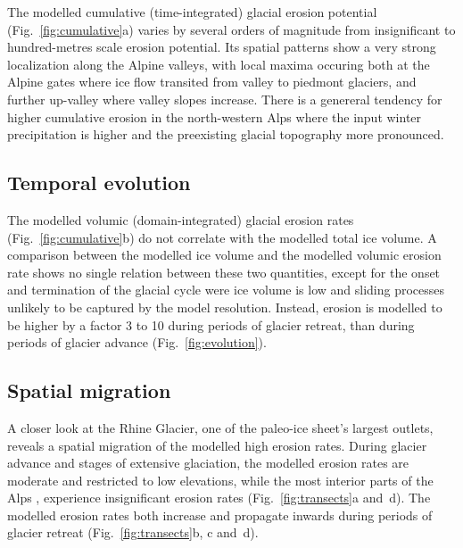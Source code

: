 \documentclass[utf8]{article}
\begin{document}
    The modelled cumulative (time-integrated) glacial erosion potential
    (Fig.~\ref{fig:cumulative}a) varies by several orders of magnitude
    from insignificant to hundred-metres scale erosion
    potential. Its spatial patterns show a very
    strong localization along the Alpine valleys, with local maxima occuring both at
    the Alpine gates where ice flow transited from valley to piedmont glaciers,
    and further up-valley where valley slopes increase.
    There is a genereral tendency for higher cumulative erosion in the
    north-western Alps where the input winter precipitation
    \citep[WorldClim,][Fig.~1h]{Seguinot.etal.2018} is higher and the
    preexisting glacial topography more pronounced.

\subsection{Temporal evolution}

    The modelled volumic (domain-integrated) glacial erosion rates
    (Fig.~\ref{fig:cumulative}b) do not correlate with the modelled total ice
    volume. A comparison between the modelled ice volume and the modelled
    volumic erosion rate shows no single relation between these two quantities, except
    for the onset and termination of the glacial cycle were ice volume is low
    and sliding processes unlikely to be captured by the model resolution.
    Instead, erosion is modelled to be higher by a factor 3 to 10 during
    periods of glacier retreat, than during periods of glacier advance
    (Fig.~\ref{fig:evolution}).

\subsection{Spatial migration}

    A closer look at the Rhine Glacier, one of the paleo-ice sheet's largest
    outlets, reveals a spatial migration of the modelled high erosion rates.
    During glacier advance and stages of extensive glaciation, the modelled
    erosion rates are moderate and restricted to low elevations, while the
    most interior parts of the Alps \citep[modelled to be
    largely-cold-based][Fig.~6c]{Seguinot.etal.2018}, experience insignificant
    erosion rates (Fig.~\ref{fig:transects}a and~d). The modelled erosion
    rates both increase and propagate inwards during periods of glacier
    retreat (Fig.~\ref{fig:transects}b, c and~d).
\end{document}
